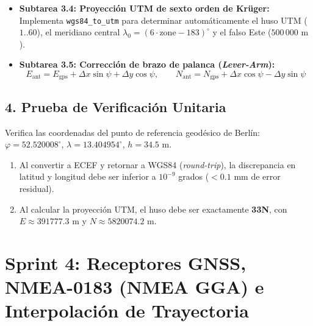 \documentclass[11pt,a4paper]{article}
\begin{document}
\begin{itemize}
    \item \textbf{Subtarea 3.4: Proyección UTM de sexto orden de Krüger:}
    Implementa \texttt{wgs84\_to\_utm} para determinar automáticamente el huso UTM ($1..60$), el meridiano central $\lambda_0 = (6 \cdot \text{zone} - 183)^\circ$ y el falso Este ($500\,000\text{ m}$).

    \item \textbf{Subtarea 3.5: Corrección de brazo de palanca (\textit{Lever-Arm}):}
    \begin{equation}
        E_{\text{ant}} = E_{\text{gps}} + \Delta x \sin\psi + \Delta y \cos\psi, \qquad
        N_{\text{ant}} = N_{\text{gps}} + \Delta x \cos\psi - \Delta y \sin\psi
    \end{equation}
\end{itemize}

\subsection{4. Prueba de Verificación Unitaria}
Verifica las coordenadas del punto de referencia geodésico de Berlín:
$\varphi = 52.520008^\circ$, $\lambda = 13.404954^\circ$, $h = 34.5\text{ m}$.
\begin{enumerate}
    \item Al convertir a ECEF y retornar a WGS84 (\textit{round-trip}), la discrepancia en latitud y longitud debe ser inferior a $10^{-9}$ grados ($< 0.1\text{ mm}$ de error residual).
    \item Al calcular la proyección UTM, el huso debe ser exactamente \textbf{33N}, con $E \approx 391777.3\text{ m}$ y $N \approx 5820074.2\text{ m}$.
\end{enumerate}

\section{Sprint 4: Receptores GNSS, NMEA-0183 (NMEA GGA) e Interpolación de Trayectoria}
\end{document}
